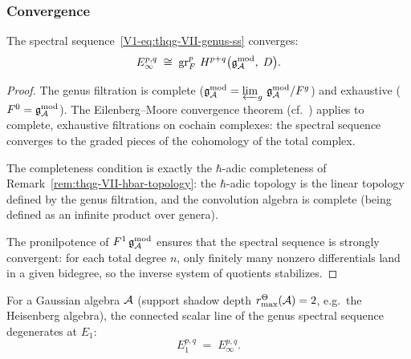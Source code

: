 \subsubsection{Convergence}

\begin{theorem}
\label{thm:thqg-VII-ss-convergence}
The spectral
sequence~\eqref{V1-eq:thqg-VII-genus-ss} converges:
\begin{equation}%
E_\infty^{p,q}
\;\cong\;
\gr^p_F\, H^{p+q}\bigl(\gAmod,\; D\bigr).
\end{equation}
\end{theorem}

\begin{proof}
The genus filtration is complete
($\mathfrak{g}_{\mathcal{A}}^{\mathrm{mod}} = \varprojlim_g\, \mathfrak{g}_{\mathcal{A}}^{\mathrm{mod}} / F^g$) and
exhaustive ($F^0 = \mathfrak{g}_{\mathcal{A}}^{\mathrm{mod}}$). The Eilenberg--Moore
convergence theorem (cf.\ \cite[Theorem~5.5.1]{Wei94})
applies to complete, exhaustive filtrations on cochain
complexes: the spectral sequence converges to the graded
pieces of the cohomology of the total complex.

The completeness condition is exactly the $\hbar$-adic
completeness of
Remark~\ref{rem:thqg-VII-hbar-topology}: the
$\hbar$-adic topology is the linear topology defined by
the genus filtration, and the convolution algebra is complete
(being defined as an infinite product over genera).

The pronilpotence of $F^1\,\mathfrak{g}_{\mathcal{A}}^{\mathrm{mod}}$ ensures that the spectral
sequence is strongly convergent: for each total degree $n$,
only finitely many nonzero differentials land in a given
bidegree, so the inverse system of quotients stabilizes.
\end{proof}

\begin{corollary}
\label{cor:thqg-VII-gaussian-degeneration}
For a Gaussian algebra $\mathcal{A}$ \textup{(}support shadow depth
\(r^\Theta_{\max}(\mathcal{A})=2\), e.g.\ the Heisenberg algebra\textup{)},
the connected scalar line of the genus spectral sequence degenerates
at $E_1$:
\begin{equation}%
E_1^{p,q} \;=\; E_\infty^{p,q}.
\end{equation}
\end{corollary}


